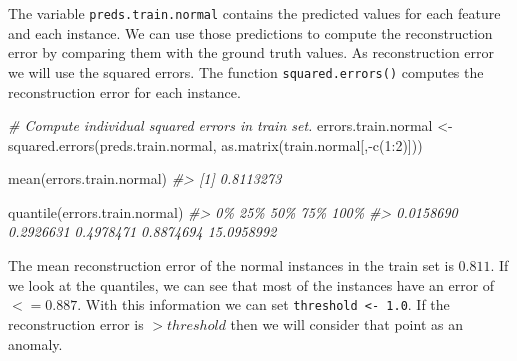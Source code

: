 \documentclass[
  11pt,
]{krantz}
\newenvironment{Shaded}{\begin{snugshade}}{\end{snugshade}}
\newcommand{\CommentTok}[1]{\textcolor[rgb]{0.37,0.37,0.37}{\textit{#1}}}
\newcommand{\DecValTok}[1]{\textcolor[rgb]{0.06,0.06,0.06}{#1}}
\newcommand{\FunctionTok}[1]{\textcolor[rgb]{0,0,0}{#1}}
\newcommand{\NormalTok}[1]{#1}
\newcommand{\OtherTok}[1]{\textcolor[rgb]{0.37,0.37,0.37}{#1}}
\newcommand{\SpecialCharTok}[1]{\textcolor[rgb]{0,0,0}{#1}}
\begin{document}
The variable \texttt{preds.train.normal} contains the predicted values for each feature and each instance. We can use those predictions to compute the reconstruction error by comparing them with the ground truth values. As reconstruction error we will use the squared errors. The function \texttt{squared.errors()} computes the reconstruction error for each instance.

\begin{Shaded}
\begin{Highlighting}[]
\CommentTok{\# Compute individual squared errors in train set.}
\NormalTok{errors.train.normal }\OtherTok{\textless{}{-}} \FunctionTok{squared.errors}\NormalTok{(preds.train.normal,}
                                   \FunctionTok{as.matrix}\NormalTok{(train.normal[,}\SpecialCharTok{{-}}\FunctionTok{c}\NormalTok{(}\DecValTok{1}\SpecialCharTok{:}\DecValTok{2}\NormalTok{)]))}

\FunctionTok{mean}\NormalTok{(errors.train.normal)}
\CommentTok{\#\textgreater{} [1] 0.8113273}

\FunctionTok{quantile}\NormalTok{(errors.train.normal)}
\CommentTok{\#\textgreater{}         0\%        25\%        50\%        75\%       100\% }
\CommentTok{\#\textgreater{}  0.0158690  0.2926631  0.4978471  0.8874694 15.0958992 }
\end{Highlighting}
\end{Shaded}

The mean reconstruction error of the normal instances in the train set is \(0.811\). If we look at the quantiles, we can see that most of the instances have an error of \(<= 0.887\). With this information we can set \texttt{threshold\ \textless{}-\ 1.0}. If the reconstruction error is \(> threshold\) then we will consider that point as an anomaly.
\end{document}
